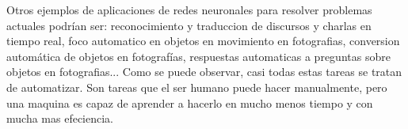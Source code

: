 Otros ejemplos de aplicaciones de redes neuronales para resolver problemas actuales podrían ser: reconocimiento y traduccion de discursos y charlas en tiempo real, foco automatico en objetos en movimiento en fotografias, conversion automática de objetos en fotografías, respuestas automaticas a preguntas sobre objetos en fotografias... Como se puede observar, casi todas estas tareas se tratan de automatizar. Son tareas que el ser humano puede hacer manualmente, pero una maquina es capaz de aprender a hacerlo en mucho menos tiempo y con mucha mas efeciencia.








\newpage \thispagestyle{empty} %